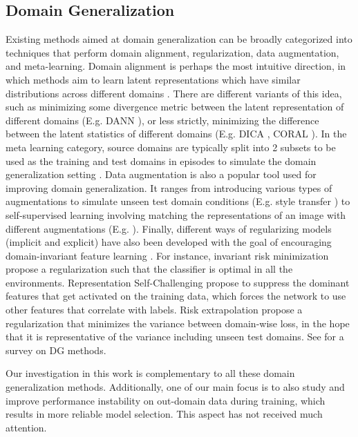 \documentclass{article}
\begin{document}
\subsection{Domain Generalization}
\label{sec_related_work_dg}
\vspace{-8pt}
Existing methods aimed at domain generalization can be broadly categorized into techniques that perform domain alignment, regularization, data augmentation, and meta-learning. Domain alignment is perhaps the most intuitive direction, in which methods aim to learn latent representations which have similar distributions across different domains \cite{sun2016deep,li2018domain,shi2021gradient,rame2021fishr}. There are different variants of this idea, such as minimizing some divergence metric between the latent representation of different domains (E.g. DANN \cite{ganin2016domain}), or less strictly, minimizing the difference between the latent statistics of different domains (E.g. DICA \cite{muandet2013domain}, CORAL \cite{sun2016deep}).
In the meta learning category, source domains are typically split into 2 subsets to be used as the training and test domains in episodes to simulate the domain generalization setting \cite{li2018learning,li2019episodic}. Data augmentation is also a popular tool used for improving domain generalization. It ranges from introducing various types of augmentations to simulate unseen test domain conditions (E.g. style transfer \cite{yue2019domain, zhou2021semi}) to self-supervised learning involving matching the representations of an image with different augmentations (E.g. \cite{albuquerque2020improving,bucci2021self}). Finally, different ways of regularizing models (implicit and explicit) have also been developed with the goal of encouraging domain-invariant feature learning \cite{sagawa2019distributionally,xu2020adversarial,wang2020heterogeneous}. For instance, invariant risk minimization \cite{arjovsky2019invariant} propose a regularization such that the classifier is optimal in all the environments. Representation Self-Challenging \cite{huang2020self} propose to suppress the dominant features that get activated on the training data, which forces the network to use other features that correlate with labels. Risk extrapolation \cite{krueger2021out} propose a regularization that minimizes the variance between domain-wise loss, in the hope that it is representative of the variance including unseen test domains. See \cite{zhou2021domain} for a survey on DG methods. 

Our investigation in this work is complementary to all these domain generalization methods. Additionally, one of our main focus is to also study and improve performance instability on out-domain data during training, which results in more reliable model selection. This aspect has not received much attention. 
\end{document}
